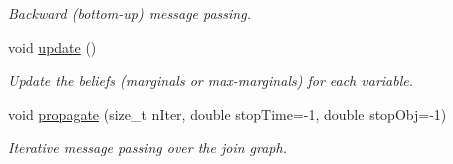 \begin{DoxyCompactItemize}
\begin{DoxyCompactList}\small\item\em Backward (bottom-\/up) message passing. \end{DoxyCompactList}\item 
\hypertarget{classmerlin_1_1ijgp_ac44f5db012d6b2ef76aae27a6eaff0da}{}void \hyperlink{classmerlin_1_1ijgp_ac44f5db012d6b2ef76aae27a6eaff0da}{update} ()\label{classmerlin_1_1ijgp_ac44f5db012d6b2ef76aae27a6eaff0da}

\begin{DoxyCompactList}\small\item\em Update the beliefs (marginals or max-\/marginals) for each variable. \end{DoxyCompactList}\item 
void \hyperlink{classmerlin_1_1ijgp_a76bf2137d3b82d923d1d4dcbd5353b21}{propagate} (size\+\_\+t n\+Iter, double stop\+Time=-\/1, double stop\+Obj=-\/1)
\begin{DoxyCompactList}\small\item\em Iterative message passing over the join graph. \end{DoxyCompactList}\end{DoxyCompactItemize}
